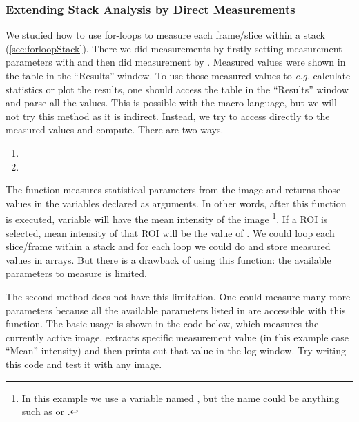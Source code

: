 \subsubsection{Extending Stack Analysis by Direct Measurements}

We studied how to use for-loops to measure each frame/slice within a stack (\ref{sec:forloopStack}). There we did measurements by firstly setting measurement parameters with  and then did measurement by . Measured values were shown in the table in the ``Results'' window. To use those measured values to \textit{e.g.} calculate statistics or plot the results, one should access the table in the ``Results'' window and parse all the values. This is possible with the macro language, but we will not try this method as it is indirect. Instead, we try to access directly to the measured values and compute. There are two ways.

\begin{enumerate}
\item {}
\item {}
\end{enumerate}
The function  measures statistical parameters from the image and returns those values in the variables declared as arguments. In other words, after this function is executed, variable  will have the mean intensity of the image
\footnote{In this example we use a variable named , but the name could be anything such as  or .}. 
If a ROI is selected, mean intensity of that ROI will be the value of . We could loop each slice/frame within a stack and for each loop we could do  and store measured values in arrays. But there is a drawback of using this function: the available parameters to measure is limited.

The second method  does not have this limitation. One could measure many more parameters because all the available parameters listed in  are accessible with this function. The basic usage is shown in the code below, which measures the currently active image, extracts specific measurement value (in this example case ``Mean'' intensity) and then prints out that value in the log window. Try writing this code and test it with any image.